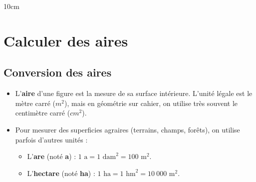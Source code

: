 \documentclass[a4paper]{book}
\begin{document}
    \begin{ZoneReponse}{10cm}
    \end{ZoneReponse}


\section{Calculer des aires}

\subsection{Conversion des aires}

    \begin{remarque}
        \begin{itemize}
            \item L'\textbf{aire} d'une figure est la mesure de sa surface intérieure. L'unité légale est le mètre carré ($m^2$), mais en géométrie sur cahier, on utilise très souvent le centimètre carré ($cm^2$).

            \item  Pour mesurer des superficies agraires (terrains, champs, forêts), on utilise parfois d'autres unités : 
            \begin{itemize}
                \item L'\textbf{are} (noté \textbf{a}) : $1 \text{ a} = 1 \text{ dam}^2 = 100 \text{ m}^2$.
                \item L'\textbf{hectare} (noté \textbf{ha}) : $1 \text{ ha} = 1 \text{ hm}^2 = 10\ 000 \text{ m}^2$.
            \end{itemize}
        \end{itemize}
    \end{remarque}
    
\end{document}
